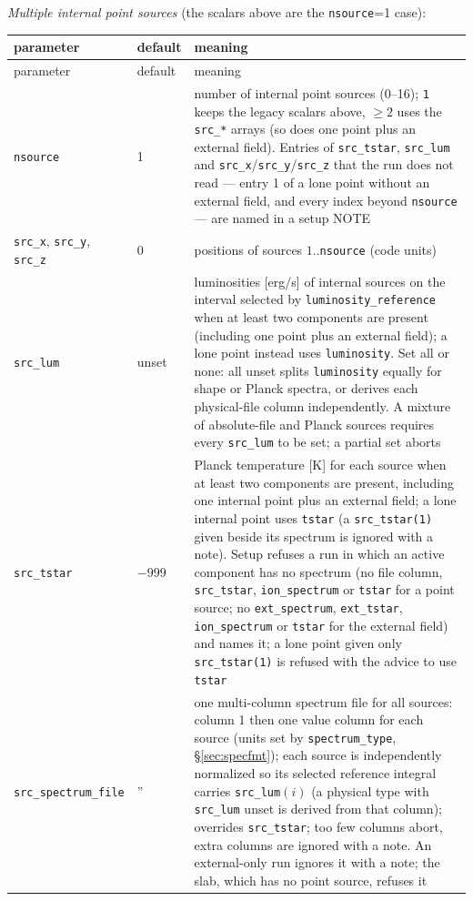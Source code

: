 \documentclass[english,a4paper]{my_memo}
\newcommand{\code}[1]{\texttt{#1}}
\begin{document}
\noindent\emph{Multiple internal point sources} (the scalars above are the
\code{nsource}=1 case):
{\small
\begin{longtable}{llp{7.2cm}}
\toprule
parameter & default & meaning \\
\midrule
\endfirsthead
\toprule
parameter & default & meaning \\
\midrule
\endhead
\bottomrule
\endlastfoot
\code{nsource} & 1 & number of internal point sources (0--16); \code{1} keeps the legacy scalars above, $\ge 2$ uses the \code{src\_*} arrays (so does one point plus an external field).  Entries of \code{src\_tstar}, \code{src\_lum} and \code{src\_x}/\code{src\_y}/\code{src\_z} that the run does not read --- entry 1 of a lone point without an external field, and every index beyond \code{nsource} --- are named in a setup NOTE \\
\code{src\_x}, \code{src\_y}, \code{src\_z} & 0 & positions of sources $1..$\code{nsource} (code units) \\
\code{src\_lum} & unset & luminosities [erg/s] of internal sources on the interval selected by \code{luminosity\_reference} when at least two components are present (including one point plus an external field); a lone point instead uses \code{luminosity}.  Set all or none: all unset splits \code{luminosity} equally for shape or Planck spectra, or derives each physical-file column independently.  A mixture of absolute-file and Planck sources requires every \code{src\_lum} to be set; a partial set aborts \\
\code{src\_tstar} & $-999$ & Planck temperature [K] for each source when at least two components are present, including one internal point plus an external field; a lone internal point uses \code{tstar} (a \code{src\_tstar(1)} given beside its spectrum is ignored with a note).  Setup refuses a run in which an active component has no spectrum (no file column, \code{src\_tstar}, \code{ion\_spectrum} or \code{tstar} for a point source; no \code{ext\_spectrum}, \code{ext\_tstar}, \code{ion\_spectrum} or \code{tstar} for the external field) and names it; a lone point given only \code{src\_tstar(1)} is refused with the advice to use \code{tstar} \\
\code{src\_spectrum\_file} & '' & one multi-column spectrum file for all sources: column 1 then one value column for each source (units set by \code{spectrum\_type}, \S\ref{sec:specfmt}); each source is independently normalized so its selected reference integral carries \code{src\_lum}$(i)$ (a physical type with \code{src\_lum} unset is derived from that column); overrides \code{src\_tstar}; too few columns abort, extra columns are ignored with a note.  An external-only run ignores it with a note; the slab, which has no point source, refuses it \\
\end{longtable}
}
\end{document}
